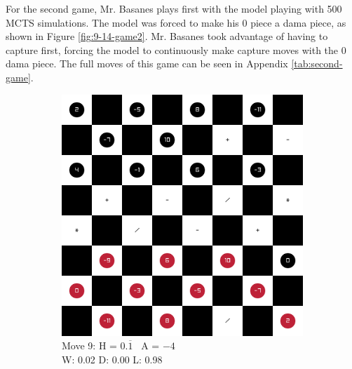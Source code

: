 
For the second game, Mr. Basanes plays first with the model playing with 500 MCTS simulations. The model was forced to make his $0$ piece a dama piece, as shown in Figure \ref{fig:9-14-game2}. Mr. Basanes took advantage of having to capture first, forcing the model to continuously make capture moves with the 0 dama piece. The full moves of this game can be seen in Appendix \ref{tab:second-game}.

\begin{figure}[H]
\centering
    \begin{subfigure}{0.3\textwidth}
        \centering
        \includegraphics[width=\textwidth]{images/games/game2/move_10.png}
        \caption*{Move 9: H = $0.\overline1$ \textbar\ A = $-4$ \\ W: 0.02 D: 0.00 L: 0.98}
    \end{subfigure}
    \quad
    \begin{subfigure}{0.3\textwidth}
        \centering

\end{subfigure}
\end{figure}
